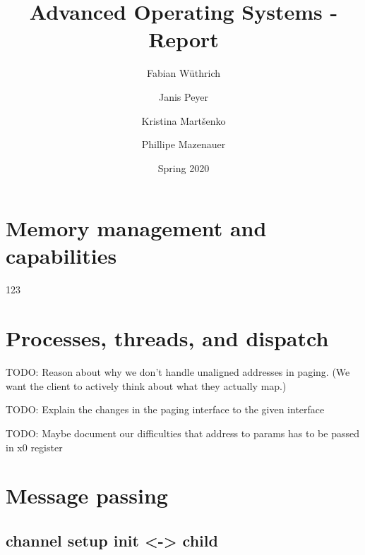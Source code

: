 \documentclass[11pt,a4paper]{report}
\begin{document}
\title{Advanced Operating Systems - Report}
\author{
Fabian Wüthrich
\and
Janis Peyer 
\and
Kristina Martšenko
\and
Phillipe Mazenauer
}
\date{Spring 2020}

\maketitle

\tableofcontents

\listoffigures

\listoftables

\clearpage

\chapter{Memory management and capabilities}

123 \cite{aos-book}

\chapter{Processes, threads, and dispatch}

TODO: Reason about why we don't handle unaligned addresses in paging. (We want the client to actively think about what they actually map.)

TODO: Explain the changes in the paging interface to the given interface

TODO: Maybe document our difficulties that address to params has to be passed in x0 register

\chapter{Message passing}

\section{channel setup init <-> child}
\end{document}
